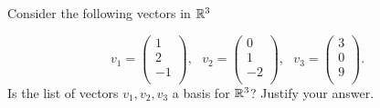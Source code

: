 \begin{question}
    \normalfont
    Consider the following vectors in $\mathbb R^3$

    $$ v_1 =  \left( \begin{array}{c}
                1  \\
                2  \\
                -1 \\
            \end{array} \right),\ \ \   v_2 =  \left( \begin{array}{c}
                0  \\
                1  \\
                -2 \\
            \end{array}\right), \ \ \
        v_3 =  \left( \begin{array}{c}
                3 \\
                0 \\
                9 \\
            \end{array} \right). $$
    Is the list of vectors $v_1, v_2, v_3$ \hspace{.1cm} a basis for $\mathbb R^3$? Justify your answer.

\end{question}